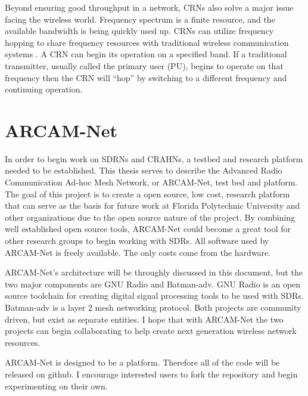 Beyond ensuring good throughput in a network, CRNs also solve a major issue facing the wireless world. Frequency spectrum is a finite resource, and the available bandwidth is being quickly used up. CRNs can utilize frequency hopping to share frequency resources with traditional wireless communication systems  \cite{6892537}. A CRN can begin its operation on a specified band. If a traditional transmitter, usually called the primary user (PU), begins to operate on that frequency then the CRN will ``hop'' by switching to a different frequency and continuing operation. 


\section{ARCAM-Net}

In order to begin work on SDRNs and CRAHNs, a testbed and research platform needed to be established. This thesis serves to describe the Advanced Radio Communication Ad-hoc Mesh Network, or ARCAM-Net, test bed and platform. The goal of this project is to create a open source, low cost, research platform that can serve as the basis for future work at Florida Polytechnic University and other organizations due to the open source nature of the project. By combining well established open source tools, ARCAM-Net could become a great tool for other research groups to begin working with SDRs. All software used by ARCAM-Net is freely available. The only costs come from the hardware. 

ARCAM-Net's architecture will be throughly discussed in this document, but the two major components are GNU Radio and Batman-adv. GNU Radio is an open source toolchain for creating digital signal processing tools to be used with SDRs. Batman-adv is a layer 2 mesh networking protocol. Both projects are community driven, but exist as separate entities. I hope that with ARCAM-Net the two projects can begin collaborating to help create next generation wireless network resources. 

ARCAM-Net is designed to be a platform. Therefore all of the code will be released on github. I encourage interested users to fork the repository and begin experimenting on their own. 

